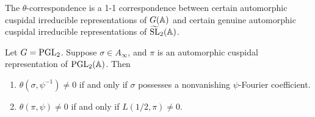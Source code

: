 \begin{theorem}
\label{thm:3.2}
The $\theta$-correspondence  is a 1-1 correspondence between certain automorphic cuspidal irreducible representations of $G(\mathbb{A})$ and certain genuine automorphic cuspidal irreducible representations of $\widetilde{\mathrm{SL}}_2(\mathbb{A})$.
\end{theorem}


\begin{theorem}
\label{thm:3.3} 
Let $G = \mathrm{PGL}_2$. Suppose $\sigma \in A_\infty$, and $\pi$ is an automorphic cuspidal representation of $\mathrm{PGL}_2(\mathbb{A})$. Then
\begin{enumerate}
    \item $\theta(\sigma, \psi^{-1}) \neq 0$ if and only if $\sigma$ possesses a nonvanishing $\psi$-Fourier coefficient.
    \item $\theta(\pi, \psi) \neq 0$ if and only if $L(1/2, \pi) \neq 0$.
\end{enumerate}
\end{theorem}

